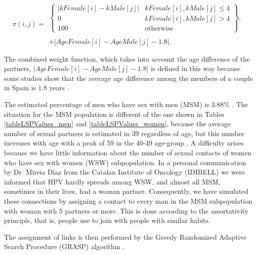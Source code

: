 \begin{equation}
\pi(i,j) = 
\begin{array}{l}
\left\lbrace \begin{array}{lc}
| kFemale[i] - kMale[j] | & kFemale[i], kMale[j] \le 4 \\
0 & kFemale[i], kMale[j] > 4 \\
100 & \mbox{otherwise}
\end{array} \right\rbrace, \\
\\
 + | AgeFemale[i] - AgeMale[j] - 1.8 |.
\end{array}
\label{peso}
\end{equation}

The combined weight function, which takes into account the age difference of the partners, $\vert AgeFemale[i] - AgeMale[j] - 1.8 \vert$ is defined in this way because some studies show that the average age difference among the members of a couple in Spain is $1.8$ years \cite{miret2010similitud}. 


The estimated percentage of men who have sex with men (MSM) is $3.88\%$  \cite{INE}. The situation for the MSM population is different of the one shown in Tables \ref{tableLSPValues_men} and \ref{tableLSPValues_women}, because the average number of sexual partners is estimated in 39 regardless of age, but this number increases with age with a peak of 59 in the 40-49 age-group \cite{Durex2002}.
A difficulty arises because we have little information about the number of sexual contacts of women who have sex with women (WSW) subpopulation. In a personal communication by Dr. Mireia D\'iaz from the Catalan Institute of Oncology (IDIBELL) we were informed that HPV hardly spreads among WSW, and almost all MSM, sometimes in their lives, had a woman partner. Consequently, we have simulated these connections by assigning a contact to every man in the MSM subpopulation with woman with 5 partners or more. This is done according to the assortativity principle, that is, people use to join with people with similar habits.

The assignment of links is then performed by the Greedy Randomized Adaptive Search Procedure (GRASP) algorithm \cite{cormen2009introduction,feo1995greedy}. %

